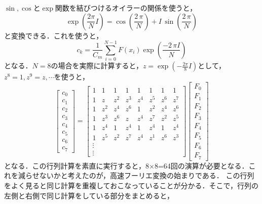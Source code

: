 $\sin, \cos$と$\exp$関数を結びつけるオイラーの関係を使うと，
\begin{equation*}
{\exp\left({\frac {2\pi}{N}}I\right)}=\cos \left({\frac { 2\,\pi }{N}} \right) +I\,\sin \left( {\frac {2\,\pi }{N}} \right) \end{equation*}
と変換できる．これを使うと，
\begin{equation*}
c_{{k}}=\frac{1}{C_{{m}}}\sum _{i=0}^{N-1}F \left( x_{{i}} \right) {{\exp}\left({{\frac {-2\,\pi I}{N}}}\right)}
\end{equation*}
となる．$N = 8$の場合を実際に計算すると，$\displaystyle z = \exp(-\frac{2\pi}{8}I)$として，$z^8=1,z^9=z, \cdots$を使うと，
\begin{equation*}
\left[\begin{array}{c}
c_0\\c_1\\c_2\\c_3\\c_4\\c_5\\c_6\\c_7
\end{array}\right] =
\left[\begin{array}{cccccccc}
1&1&1&1&1&1&1&1\\
1&z&z^2&z^3&z^4&z^5&z^6&z^7\\
1&z^2&z^4&z^6&1&z^2&z^4&z^6\\
1&z^3&z^6&z&z^4&z^7&z^2&z^5\\
1&z^4&1&z^4&1&z^4&1&z^4\\
1&z^5&z^2&z^7&z^4&z^1&z^6&z^3\\
\vdots & & & & & & &  \\
\vdots & & & & & & & 
\end{array}\right]
\left[\begin{array}{c}
F_0\\F_1\\F_2\\F_3\\F_4\\F_5\\F_6\\F_7
\end{array}\right]
\end{equation*}
となる．この行列計算を素直に実行すると，8×8=64回の演算が必要となる．これを減らせないかと考えたのが，高速フーリエ変換の始まりである．
この行列をよく見ると同じ計算を重複しておこなっていることが分かる．そこで，行列の左側と右側で同じ計算をしている部分をまとめると，
